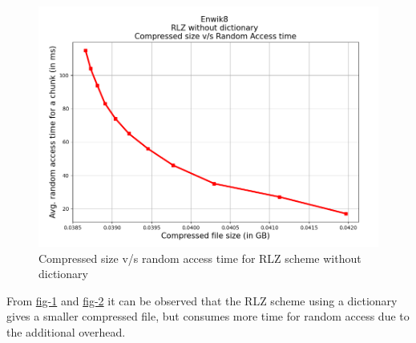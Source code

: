 \begin{figure}[H]
    \centering
    \includegraphics[width=\textwidth/2]{Figs/Enwik8_RLZ_nodict.png}
    \caption{Compressed size v/s random access time for RLZ scheme without dictionary}
    \label{fig:enwik8_rlz_nodict}
\end{figure}

From \href{fig:enwik8_rlz_dict}{fig-1} and \href{fig:enwik8_rlz_nodict}{fig-2} it can be observed that the RLZ scheme using a dictionary gives a smaller compressed file, but consumes more time for random access due to the additional overhead.

